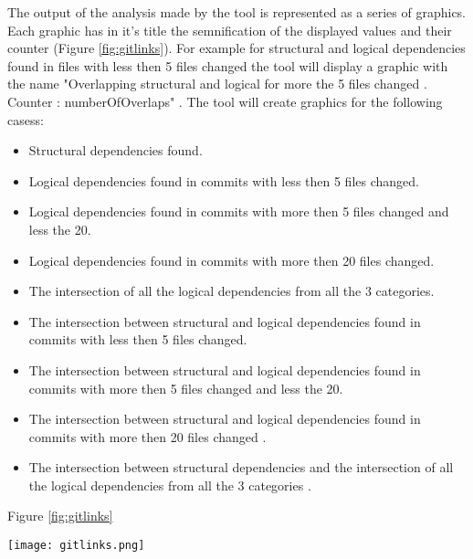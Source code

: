 \tab The output of the analysis made by the tool is represented as a series of graphics. Each graphic has in it's title the semnification of the displayed values and their counter (Figure \ref{fig:gitlinks}). For example for structural and logical dependencies found in files with less then 5 files changed the tool will display a graphic with the name "Overlapping structural and logical for more the 5 files changed . Counter : numberOfOverlaps" .
The tool will create graphics for the following casess: 
\begin{itemize}
  \item Structural dependencies found.
  \item Logical dependencies found in commits with less then 5 files changed.
  \item Logical dependencies found in commits with more then 5 files changed and less the 20.
  \item Logical dependencies found in commits with more then 20 files changed.
  \item The intersection of all the logical dependencies from all the 3 categories.
  \item The intersection between structural and logical dependencies found in commits with less then 5 files changed.
  \item The intersection between structural and logical dependencies found in commits with more then 5 files changed and less the 20.
  \item The intersection between structural and logical dependencies found in commits with more then 20 files changed .
  \item The intersection between structural dependencies and the intersection of all the logical dependencies from all the 3 categories .
\end{itemize}

Figure \ref{fig:gitlinks}
\begin{figure*}[h]
\centering
\texttt{[image: gitlinks.png]}
\caption{Output graph from the analysis}
\label{fig:gitlinks}
\end{figure*}
